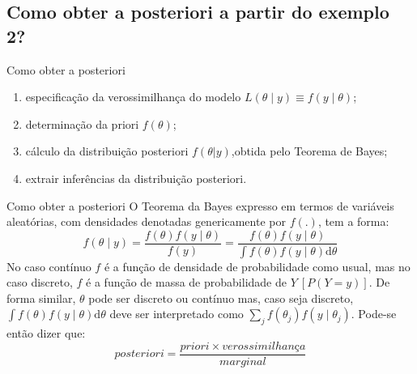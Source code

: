\documentclass{beamer}
\theoremstyle{definition}
\begin{document}
\subsection{Como obter a posteriori a partir do exemplo 2?}
\begin{frame}{Como obter a posteriori}
\vspace{0.5cm}
\begin{enumerate}
    \item especificação da verossimilhança do modelo $L(\theta \mid y) \equiv f(y \mid \theta)$;
    \item determinação da priori $f(\theta)$;
    \item cálculo da distribuição posteriori $f(\theta|y)$,obtida pelo Teorema de Bayes;
    \item extrair inferências da distribuição posteriori.
\end{enumerate}
\end{frame}

\begin{frame}{Como obter a posteriori}
O Teorema da Bayes expresso em termos de variáveis aleatórias, com densidades denotadas genericamente por $f(.)$, tem a forma:
    \begin{equation}
    f(\theta \mid y)=\frac{f(\theta) f(y \mid \theta)}{f(y)}=\frac{f(\theta) f(y \mid \theta)}{\int f(\theta) f(y \mid \theta) \mathrm{d} \theta}
    \end{equation}
    No caso contínuo $f$ é a função de densidade de probabilidade como usual, mas no caso discreto, $f$ é a função de massa de probabilidade de $Y~[P(Y=y)]$. De forma similar, $\theta$ pode ser discreto ou contínuo mas, caso seja discreto, $\int f(\theta) f(y \mid \theta) \mathrm{d} \theta$ deve ser interpretado como $\sum_j f\left(\theta_j\right) f\left(y \mid \theta_j\right)$.
    Pode-se então dizer que:
    $$posteriori=\frac{priori \times verossimilhança}{marginal}$$

\end{frame}
\end{document}
